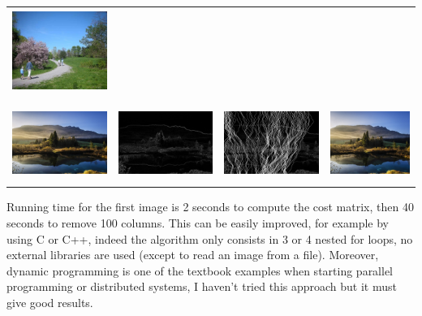 \documentclass[a4paper]{article}
\begin{document}
\begin{center}
\begin{tabular}{cccc}
  \includegraphics[height=2.7cm]{results_seamcarving/2/image_output.png} \\\\
  \includegraphics[height=2.5cm]{results_seamcarving/3/image_input.png} &
  \includegraphics[height=2.5cm]{results_seamcarving/3/cost_init.png} &
  \includegraphics[height=2.5cm]{results_seamcarving/3/cost_remove.png} &
  \includegraphics[height=2.5cm]{results_seamcarving/3/image_output.png}
  \end{tabular}
  \end{center}
  
  Running time for the first image is 2 seconds to compute the cost matrix, then 40 seconds to remove 100 columns. This can be easily improved, for example by using C or C++, indeed the algorithm only consists in 3 or 4 nested for loops, no external libraries are used (except to read an image from a file). Moreover, dynamic programming is one of the textbook examples when starting parallel programming or distributed systems, I haven't tried this approach but it must give good results.
  
\end{document}
